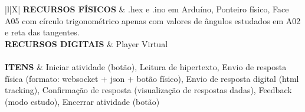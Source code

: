 \begin{xltabular}{\textwidth}{|l|X|}
	\textbf{RECURSOS FÍSICOS} & .hex e .ino em Arduíno, Ponteiro físico, Face A05 com círculo trigonométrico apenas com valores de ângulos estudados em A02 e reta das tangentes.  \\ \hline
	\textbf{RECURSOS DIGITAIS} & Player Virtual \\ \hline		
	 \\ \hline
	\textbf{ITENS} & Iniciar atividade (botão), Leitura de hipertexto, Envio de resposta física (formato: websocket + json + botão físico), Envio de resposta digital (html tracking), Confirmação de resposta (visualização de respostas dadas), Feedback (modo estudo), Encerrar atividade (botão)  \\ \hline
	
\end{xltabular}

